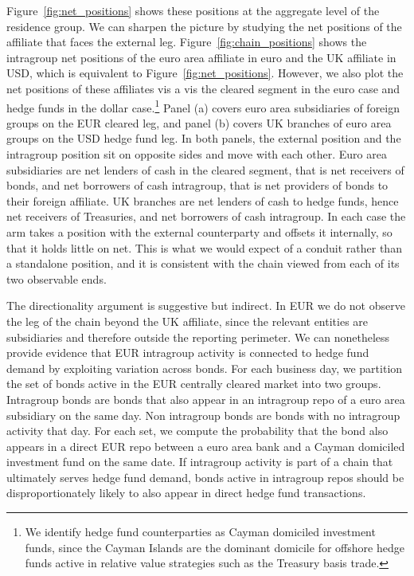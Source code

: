 \documentclass[english, 11pt, oneside, legal]{article}
\begin{document}
Figure~\ref{fig:net_positions} shows these positions at the aggregate level of the residence group. We can sharpen the picture by studying the net positions of the affiliate that faces the external leg. Figure~\ref{fig:chain_positions} shows the intragroup net positions of the euro area affiliate in euro and the UK affiliate in USD, which is equivalent to Figure~\ref{fig:net_positions}. However, we also plot the net positions of these affiliates vis a vis the cleared segment in the euro case and hedge funds in the dollar case.\footnote{We identify hedge fund counterparties as Cayman domiciled investment funds, since the Cayman Islands are the dominant domicile for offshore hedge funds active in relative value strategies such as the Treasury basis trade.} Panel (a) covers euro area subsidiaries of foreign groups on the EUR cleared leg, and panel (b) covers UK branches of euro area groups on the USD hedge fund leg. In both panels, the external position and the intragroup position sit on opposite sides and move with each other. Euro area subsidiaries are net lenders of cash in the cleared segment, that is net receivers of bonds, and net borrowers of cash intragroup, that is net providers of bonds to their foreign affiliate. UK branches are net lenders of cash to hedge funds, hence net receivers of Treasuries, and net borrowers of cash intragroup. In each case the arm takes a position with the external counterparty and offsets it internally, so that it holds little on net. This is what we would expect of a conduit rather than a standalone position, and it is consistent with the chain viewed from each of its two observable ends. 

The directionality argument is suggestive but indirect. In EUR we do not observe the leg of the chain beyond the UK affiliate, since the relevant entities are subsidiaries and therefore outside the reporting perimeter. We can nonetheless provide evidence that EUR intragroup activity is connected to hedge fund demand by exploiting variation across bonds. For each business day, we partition the set of bonds active in the EUR centrally cleared market into two groups. Intragroup bonds are bonds that also appear in an intragroup repo of a euro area subsidiary on the same day. Non intragroup bonds are bonds with no intragroup activity that day. For each set, we compute the probability that the bond also appears in a direct EUR repo between a euro area bank and a Cayman domiciled investment fund on the same date. If intragroup activity is part of a chain that ultimately serves hedge fund demand, bonds active in intragroup repos should be disproportionately likely to also appear in direct hedge fund transactions.
\end{document}
